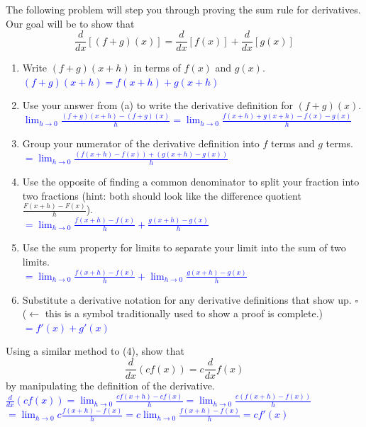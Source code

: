 \documentclass{ximera}
\begin{document}
\begin{exercise}
  The following problem will step you through proving the sum rule for derivatives. Our goal will be to show that $$\frac{d}{dx}[(f+g)(x)]=\frac{d}{dx}[f(x)]+\frac{d}{dx}[g(x)]$$
    \begin{enumerate}
        \item Write $(f+g)(x+h)$ in terms of $f(x)$ and $g(x)$. \\
        \textcolor{blue}{ $(f+g)(x+h)=f(x+h)+g(x+h)$}
        \item Use your answer from (a) to write the derivative definition for $(f+g)(x)$.\\
        \textcolor{blue}{ $\displaystyle \lim_{h\rightarrow 0}\frac{(f+g)(x+h)-(f+g)(x)}{h}=\lim_{h\rightarrow 0}\frac{f(x+h)+g(x+h)-f(x)-g(x)}{h}$}
        \item Group your numerator of the derivative definition into $f$ terms and $g$ terms.\\
        \textcolor{blue}{$\displaystyle =\lim_{h\rightarrow 0}\frac{(f(x+h)-f(x))+(g(x+h)-g(x))}{h}$}
        \item Use the opposite of finding a common denominator to split your fraction into two fractions (hint: both should look like the difference quotient $\frac{F(x+h)-F(x)}{h}$).\\
        \textcolor{blue}{ $\displaystyle =\lim_{h\rightarrow 0} \frac{f(x+h)-f(x)}{h}+\frac{g(x+h)-g(x)}{h}$}
        \item Use the sum property for limits to separate your limit into the sum of two limits.\\
        \textcolor{blue}{ $\displaystyle =\lim_{h\rightarrow 0} \frac{f(x+h)-f(x)}{h}+\lim_{h\rightarrow 0}\frac{g(x+h)-g(x)}{h}$}
        \item Substitute a derivative notation for any derivative definitions  that show up. $\square$ ($\leftarrow$ this is a symbol traditionally used to show a proof is complete.) \\
        \textcolor{blue}{ $=\displaystyle f'(x)+g'(x)$}
    \end{enumerate}
\end{exercise}

\begin{exercise}
    Using a similar method to (4), show that $$ \frac{d}{dx}(cf(x))=c\frac{d}{dx}f(x)$$ by manipulating the definition of the derivative.\\
    \textcolor{blue}{ $\displaystyle \frac{d}{dx}(cf(x))=\lim_{h\rightarrow 0} \frac{cf(x+h)-cf(x)}{h}=\lim_{h\rightarrow 0}\frac{c(f(x+h)-f(x))}{h}$\\
    $\displaystyle =\lim_{h\rightarrow 0}c\frac{f(x+h)-f(x)}{h}=c\lim_{h\rightarrow 0}\frac{f(x+h)-f(x)}{h}=cf'(x)$}
\end{exercise}
\end{document}
